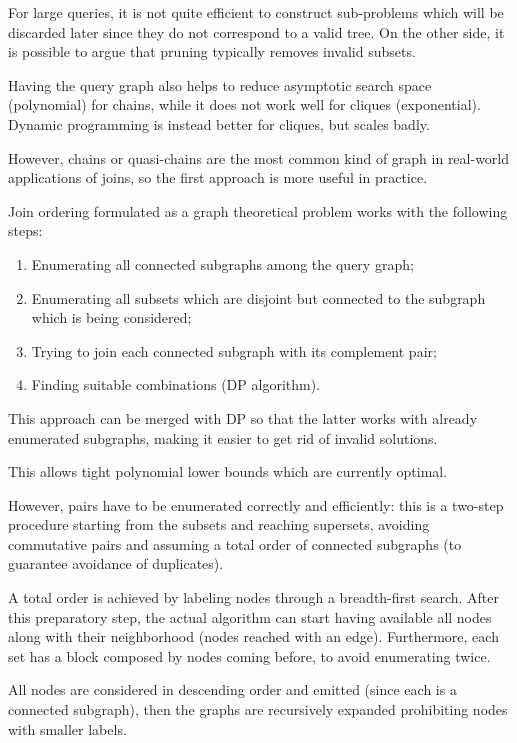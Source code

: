 For large queries, it is not quite efficient to construct sub-problems which will be discarded later since they do not correspond to a valid tree. On the other side, it is possible to argue that pruning typically removes invalid subsets.

Having the query graph also helps to reduce asymptotic search space (polynomial) for chains, while it does not work well for cliques (exponential). Dynamic programming is instead better for cliques, but scales badly.

However, chains or quasi-chains are the most common kind of graph in real-world applications of joins, so the first approach is more useful in practice.

Join ordering formulated as a graph theoretical problem works with the following steps:

\begin{enumerate}
	\item Enumerating all connected subgraphs among the query graph;
	\item Enumerating all subsets which are disjoint but connected to the subgraph which is being considered;
	\item Trying to join each connected subgraph with its complement pair;
	\item Finding suitable combinations (DP algorithm).
\end{enumerate}

This approach can be merged with DP so that the latter works with already enumerated subgraphs, making it easier to get rid of invalid solutions.

This allows tight polynomial lower bounds which are currently optimal. 

However, pairs have to be enumerated correctly and efficiently: this is a two-step procedure starting from the subsets and reaching supersets, avoiding commutative pairs and assuming a total order of connected subgraphs (to guarantee avoidance of duplicates).

A total order is achieved by labeling nodes through a breadth-first search. After this preparatory step, the actual algorithm can start having available all nodes along with their neighborhood (nodes reached with an edge). Furthermore, each set has a block composed by nodes coming before, to avoid enumerating twice.

All nodes are considered in descending order and emitted (since each is a connected subgraph), then the graphs are recursively expanded prohibiting nodes with smaller labels. 

